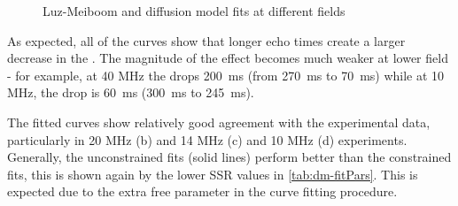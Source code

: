 \begin{figure}[h!tp]

  \caption[Luz-Meiboom and diffusion model fits at different fields]{Luz-Meiboom and diffusion model fits at different fields}
  \label{fig:dm-fitResults}
\end{figure}

As expected, all of the curves show that longer echo times create a larger decrease in the \Ttwo.
The magnitude of the effect becomes much weaker at lower field - for example, at 40 MHz the \Ttwo drops \SI{200}{ms} (from \SI{270}{ms} to \SI{70}{ms}) while at 10 MHz, the \Ttwo drop is \SI{60}{ms} (\SI{300}{ms} to \SI{245}{ms}).

The fitted curves show relatively good agreement with the experimental data, particularly in 20 MHz (b) and 14 MHz (c) and 10 MHz (d) experiments.
Generally, the unconstrained fits (solid lines) perform better than the constrained fits, this is shown again by the lower SSR values in \autoref{tab:dm-fitPars}.
This is expected due to the extra free parameter in the curve fitting procedure.

